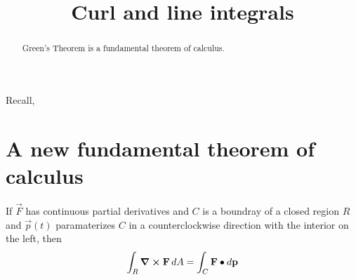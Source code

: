 \documentclass{ximera}
\title[Dig-In:]{Curl and line integrals}
\begin{document}
\begin{abstract}
Green's Theorem is a fundamental theorem of calculus.
\end{abstract}
\maketitle




Recall,

\section{A new fundamental theorem of calculus}

\begin{theorem}
  If $\vec{F}$ has continuous partial derivatives and $C$ is a
  boundray of a closed region $R$ and $\vec{p}(t)$ paramaterizes $C$
  in a counterclockwise direction with the interior on the left, then
  \[
  \int_R \boldsymbol\nabla\boldsymbol\times\mathbf{F}\mathop{}\!d A = \int_C \mathbf{F}\bullet\mathop{}\!d\mathbf{p} 
  \]
\end{theorem}
\end{document}
